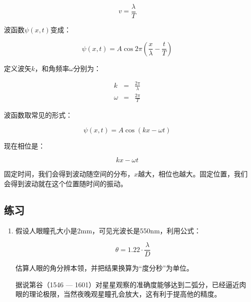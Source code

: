 \begin{equation*}
v = \frac{\lambda}{ T }
\end{equation*}

波函数$\psi(x,t)$变成：

\begin{equation}
\psi(x, t) = A \cos   2\pi \left(  \frac{x}{\lambda} - \frac{t}{T}   \right)
\end{equation}

定义波矢$k$，和角频率$\omega$分别为：

\begin{eqnarray}
k &=& \frac{2 \pi}{\lambda} \\
\omega &=& \frac{2 \pi}{T}
\end{eqnarray}

波函数取常见的形式：

\begin{equation}
\psi (x,t )= A \cos \left( k x - \omega t \right)
\end{equation}

现在相位是：

\begin{equation*}
k x - \omega t
\end{equation*}

固定时间，我们会得到波动随空间的分布，$x$越大，相位也越大。固定位置，我们会得到波动就在这个位置随时间的振动。






\subsection*{练习}

\begin{enumerate}
\item 

假设人眼瞳孔大小是2mm，可见光波长是550nm，利用公式：

\begin{equation*}
\theta = 1.22 \cdot \frac{\lambda}{D}
\end{equation*}

估算人眼的角分辨本领，并把结果换算为“度分秒”为单位。

据说第谷（1546 — 1601）对星星观察的准确度能够达到二弧分，已经逼近肉眼的理论极限，当然夜晚观星瞳孔会放大，这有利于提高他的精度。

\end{enumerate}